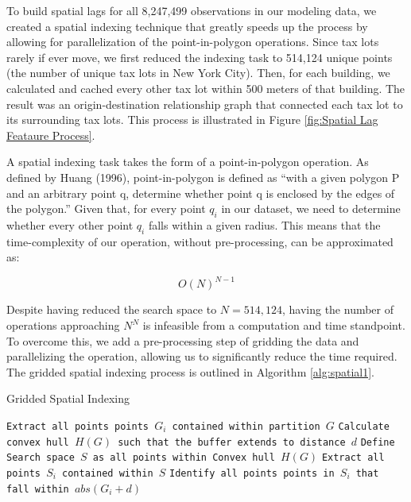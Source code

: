 \documentclass[12pt,]{article}
\begin{document}
To build spatial lags for all 8,247,499 observations in our modeling
data, we created a spatial indexing technique that greatly speeds up the
process by allowing for parallelization of the point-in-polygon
operations. Since tax lots rarely if ever move, we first reduced the
indexing task to 514,124 unique points (the number of unique tax lots in
New York City). Then, for each building, we calculated and cached every
other tax lot within 500 meters of that building. The result was an
origin-destination relationship graph that connected each tax lot to its
surrounding tax lots. This process is illustrated in Figure
\ref{fig:Spatial Lag Feataure Process}.

A spatial indexing task takes the form of a point-in-polygon operation.
As defined by Huang (1996), point-in-polygon is defined as ``with a
given polygon P and an arbitrary point q, determine whether point q is
enclosed by the edges of the polygon.'' Given that, for every point
\(q_i\) in our dataset, we need to determine whether every other point
\(q_i\) falls within a given radius. This means that the time-complexity
of our operation, without pre-processing, can be approximated as:

\[
O(N)^{N-1}
\]

\noindent Despite having reduced the search space to \(N=514,124\),
having the number of operations approaching \(N^N\) is infeasible from a
computation and time standpoint. To overcome this, we add a
pre-processing step of gridding the data and parallelizing the
operation, allowing us to significantly reduce the time required. The
gridded spatial indexing process is outlined in Algorithm
\ref{alg:spatial1}.

\begin{algorithm}
  \caption{Gridded Spatial Indexing}
  \label{alg:spatial1}
  \begin{algorithmic}[1]
        \State \texttt{Extract all points points $G_i$ contained within partition $G$}
        \State \texttt{Calculate convex hull $H(G)$ such that the buffer extends to distance $d$}
        \State \texttt{Define Search space $S$ as all points within Convex hull $H(G)$}
        \State \texttt{Extract all points $S_i$ contained within $S$}
            \State \texttt{Identify all points points in $S_i$ that fall within $abs(G_i+d)$}
        \EndFor
      \EndFor
  \end{algorithmic}
\end{algorithm}
\end{document}
